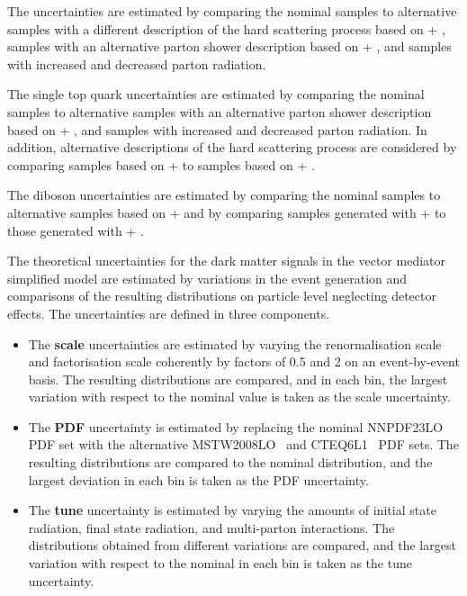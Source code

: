 The \ttbar uncertainties are estimated by comparing the nominal samples to alternative samples with a different description of the hard scattering process based on \MGMCatNLO + , samples with an alternative parton shower description based on \POWHEG + , and samples with increased and decreased parton radiation.

The single top quark uncertainties are estimated by comparing the nominal samples to alternative samples with an alternative parton shower description based on \POWHEG + \HERWIGpp, and samples with increased and decreased parton radiation. In addition, alternative descriptions of the hard scattering process are considered by comparing samples based on \POWHEG + \HERWIGpp to samples based on \MGMCatNLO + \HERWIGpp.

The diboson uncertainties are estimated by comparing the nominal samples to alternative samples based on \POWHEG +  and by comparing samples generated with \POWHEG +  to those generated with \POWHEG + \HERWIGpp.


The theoretical uncertainties for the dark matter signals in the vector mediator simplified model are estimated by variations in the event generation and comparisons of the resulting \met distributions on particle level neglecting detector effects. The uncertainties are defined in three components.
\begin{itemize}
  \item The \textbf{scale} uncertainties are estimated by varying the renormalisation scale \muR and factorisation scale \muF coherently by factors of \num{0.5} and \num{2} on an event-by-event basis. The resulting \met distributions are compared, and in each \met bin, the largest variation with respect to the nominal value is taken as the scale uncertainty.
  \item The \textbf{PDF} uncertainty is estimated by replacing the nominal \textsc{NNPDF23LO} PDF set with the alternative \textsc{MSTW2008LO}~\cite{Martin2009} and \textsc{CTEQ6L1}~\cite{Pumplin:2002vw} PDF sets. The resulting \met distributions are compared to the nominal distribution, and the largest deviation in each \met bin is taken as the PDF uncertainty.
  \item The \textbf{tune} uncertainty is estimated by varying the amounts of initial state radiation, final state radiation, and multi-parton interactions. The \met distributions obtained from different \AFourteen variations are compared, and the largest variation with respect to the nominal in each \met bin is taken as the tune uncertainty.
\end{itemize}

